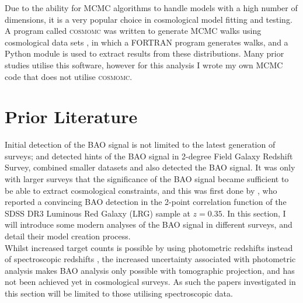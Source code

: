 \documentclass[titlesmallcaps, examinerscopy, copyrightpage]{uqthesis}
\begin{document}
Due to the ability for MCMC algorithms to handle models with a high number of dimensions, it is a very popular choice in cosmological model fitting and testing. A program called \textsc{cosmomc} was written to generate MCMC walks using cosmological data sets \citep{LewisBridle2002}, in which a FORTRAN program generates walks, and a Python module is used to extract results from these distributions. Many prior studies utilise this software, however for this analysis I wrote my own MCMC code that does not utilise \textsc{cosmomc}.





















\chapter{Prior Literature}


Initial detection of the BAO signal is not limited to the latest generation of surveys;
\cite{ColePercival2005} and \citet{PercivalBaugh2001} detected hints of the BAO signal in 2-degree Field Galaxy Redshift Survey,  \citet{MillerNichol2001} combined smaller datasets and also detected the BAO signal. It was only with larger surveys that the significance of the BAO signal became sufficient to be able to extract cosmological constraints, and this was first done by \citet{EisensteinZehavi2005}, who reported a convincing BAO detection in the 2-point correlation function of the SDSS \citep[SDSS]{YorkAdelmanAnderson2000} DR3 Luminous Red Galaxy (LRG) sample at $z = 0.35$. In this section, I will introduce some modern analyses of the BAO signal in different surveys, and detail their model creation process.\\

Whilst increased target counts is possible by using photometric redshifts instead of spectroscopic redshifts \citep[see][for analysis of the BAO signal from the SDSS Luminous Red Galaxies (LRGs) catalogue]{BlakeCollister2007,Padmanabhan2007,HoCuesta2012}, the increased uncertainty associated with photometric analysis makes BAO analysis only possible with tomographic projection, and has not been achieved yet in cosmological surveys. As such the papers investigated in this section will be limited to those utilising spectroscopic data.\\
\end{document}
